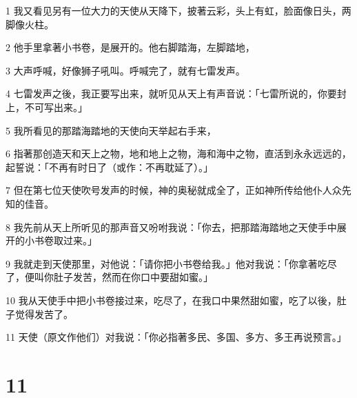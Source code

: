 \par 1 我又看见另有一位大力的天使从天降下，披著云彩，头上有虹，脸面像日头，两脚像火柱。
\par 2 他手里拿著小书卷，是展开的。他右脚踏海，左脚踏地，
\par 3 大声呼喊，好像狮子吼叫。呼喊完了，就有七雷发声。
\par 4 七雷发声之後，我正要写出来，就听见从天上有声音说：「七雷所说的，你要封上，不可写出来。」
\par 5 我所看见的那踏海踏地的天使向天举起右手来，
\par 6 指著那创造天和天上之物，地和地上之物，海和海中之物，直活到永永远远的，起誓说：「不再有时日了（或作：不再耽延了）。」
\par 7 但在第七位天使吹号发声的时候，神的奥秘就成全了，正如神所传给他仆人众先知的佳音。
\par 8 我先前从天上所听见的那声音又吩咐我说：「你去，把那踏海踏地之天使手中展开的小书卷取过来。」
\par 9 我就走到天使那里，对他说：「请你把小书卷给我。」他对我说：「你拿著吃尽了，便叫你肚子发苦，然而在你口中要甜如蜜。」
\par 10 我从天使手中把小书卷接过来，吃尽了，在我口中果然甜如蜜，吃了以後，肚子觉得发苦了。
\par 11 天使（原文作他们）对我说：「你必指著多民、多国、多方、多王再说预言。」

\chapter{11}

